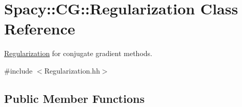 \hypertarget{classSpacy_1_1CG_1_1Regularization}{\section{Spacy\-:\-:C\-G\-:\-:Regularization Class Reference}
\label{classSpacy_1_1CG_1_1Regularization}
}


\hyperlink{classSpacy_1_1CG_1_1Regularization}{Regularization} for conjugate gradient methods.  




{\ttfamily \#include $<$Regularization.\-hh$>$}

\subsection*{Public Member Functions}

